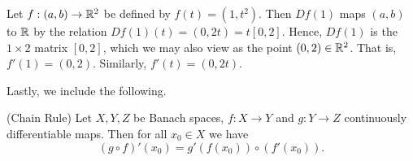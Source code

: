 \begin{framed}
\begin{example}
Let $f: (a,b) \to \mathbb{R}^2$ be defined by $f(t) = (1, t^2)$. Then $Df(1)$ maps
$(a,b)$ to $\mathbb{R}$ by the relation $Df(1)(t) = (0, 2t) = t[0, 2]$. Hence, $Df(1)$ is the $1
\times 2$ matrix $[0,2]$, which we may also view as the point $(0,2) \in \mathbb{R}^2$.
That is, $f'(1) = (0,2)$. Similarly, $f'(t) = (0,2t)$.
\end{example}
\end{framed}

Lastly, we include the following.
%
%
\begin{proposition}
    (Chain Rule) Let $X,Y,Z$ be Banach spaces, $f: X \to Y$ and $g: Y \to Z$
    continuously differentiable maps. Then for all $x_0 \in X$ we have
    \begin{equation*} (g \circ f)' (x_0) = g'(f(x_0)) \circ (f'(x_0)).
		\end{equation*} 
	\end{proposition}
